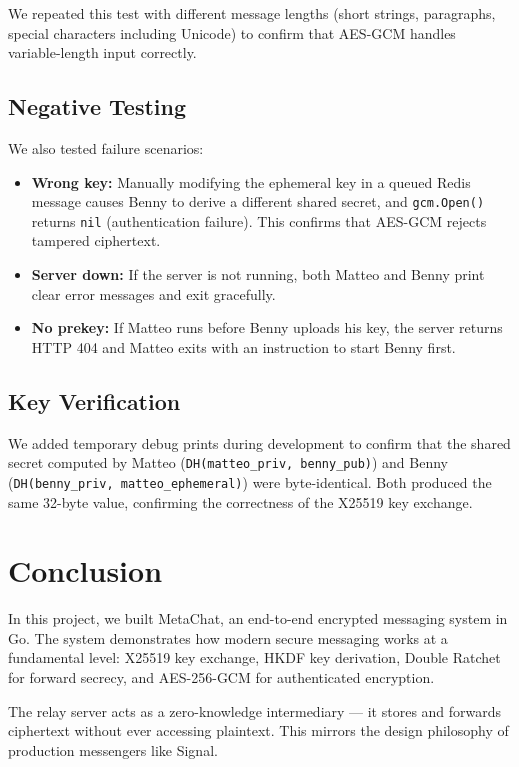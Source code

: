\documentclass[12pt,a4paper]{article}
\begin{document}
We repeated this test with different message lengths (short strings, paragraphs, special characters including Unicode) to confirm that AES-GCM handles variable-length input correctly.

\subsection{Negative Testing}

We also tested failure scenarios:
\begin{itemize}
    \item \textbf{Wrong key:} Manually modifying the ephemeral key in a queued Redis message causes Benny to derive a different shared secret, and \texttt{gcm.Open()} returns \texttt{nil} (authentication failure). This confirms that AES-GCM rejects tampered ciphertext.
    \item \textbf{Server down:} If the server is not running, both Matteo and Benny print clear error messages and exit gracefully.
    \item \textbf{No prekey:} If Matteo runs before Benny uploads his key, the server returns HTTP 404 and Matteo exits with an instruction to start Benny first.
\end{itemize}

\subsection{Key Verification}

We added temporary debug prints during development to confirm that the shared secret computed by Matteo (\texttt{DH(matteo\_priv, benny\_pub)}) and Benny (\texttt{DH(benny\_priv, matteo\_ephemeral)}) were byte-identical. Both produced the same 32-byte value, confirming the correctness of the X25519 key exchange.

\section{Conclusion}

In this project, we built MetaChat, an end-to-end encrypted messaging system in Go. The system demonstrates how modern secure messaging works at a fundamental level: X25519 key exchange, HKDF key derivation, Double Ratchet for forward secrecy, and AES-256-GCM for authenticated encryption.

The relay server acts as a zero-knowledge intermediary --- it stores and forwards ciphertext without ever accessing plaintext. This mirrors the design philosophy of production messengers like Signal.
\end{document}
